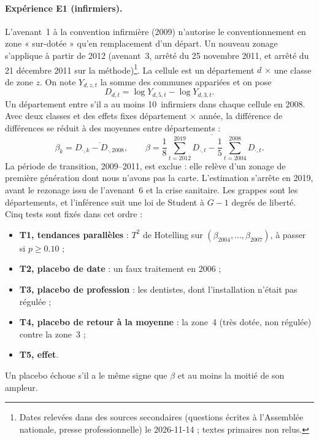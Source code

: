 \documentclass[11pt]{article}
\begin{document}
\paragraph{Expérience E1 (infirmiers).} L'avenant~1 à la convention infirmière (2009) n'autorise le
conventionnement en zone « sur-dotée » qu'en remplacement d'un départ. Un nouveau zonage s'applique
à partir de 2012 (avenant~3, arrêté du 25 novembre 2011, et arrêté du 21 décembre 2011 sur la
méthode)\footnote{Dates relevées dans des sources secondaires (questions écrites à l'Assemblée
nationale, presse professionnelle) le 2026-11-14 ; textes primaires non relus.}. La cellule est un
département $d$ $\times$ une classe de zone $z$. On note $Y_{d,z,t}$ la somme des communes appariées
et on pose
\[
  D_{d,t} = \log Y_{d,5,t} - \log Y_{d,3,t}.
\]
Un département entre s'il a au moins 10\suppose{}~infirmiers dans chaque cellule en 2008. Avec deux
classes et des effets fixes département $\times$ année, la différence de différences se réduit à des
moyennes entre départements :
\[
  \beta_k = \overline{D_{\cdot,k} - D_{\cdot,2008}}, \qquad
  \beta = \overline{\textstyle\frac18\sum_{t=2012}^{2019} D_{\cdot,t}
           - \frac15\sum_{t=2004}^{2008} D_{\cdot,t}}.
\]
La période de transition, 2009--2011, est exclue : elle relève d'un zonage de première génération
dont nous n'avons pas la carte. L'estimation s'arrête en 2019, avant le rezonage issu de
l'avenant~6 et la crise sanitaire. Les grappes sont les départements, et l'inférence suit une loi de
Student à $G-1$ degrés de liberté. Cinq tests sont fixés dans cet ordre :
\begin{itemize}
  \item \textbf{T1, tendances parallèles} : $T^2$ de Hotelling sur $(\beta_{2004},\dots,\beta_{2007})$,
        à passer si $p \ge \num{0.10}$\suppose{} ;
  \item \textbf{T2, placebo de date} : un faux traitement en 2006 ;
  \item \textbf{T3, placebo de profession} : les dentistes, dont l'installation n'était pas
        régulée\suppose{} ;
  \item \textbf{T4, placebo de retour à la moyenne} : la zone~4 (très dotée, non régulée) contre la
        zone~3 ;
  \item \textbf{T5, effet}.
\end{itemize}
Un placebo échoue s'il a le même signe que $\beta$ et au moins la moitié\suppose{} de son ampleur.
\end{document}
